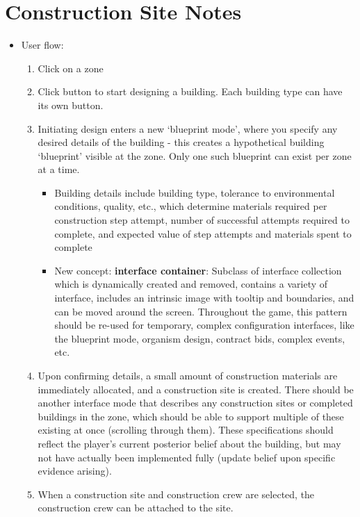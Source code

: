 \documentclass{article}
\begin{document}
\section*{Construction Site Notes}
\begin{itemize}
    \item User flow:
    \begin{enumerate}
        \item Click on a zone
        \item Click button to start designing a building. Each building type can have its own button.
        \item Initiating design enters a new `blueprint mode', where you specify any desired details of the building - this creates a
            hypothetical building `blueprint' visible at the zone. Only one such blueprint can exist per zone at a time.
        \begin{itemize}
            \item Building details include building type, tolerance to environmental conditions, quality, etc., which determine materials
                required per construction step attempt, number of successful attempts required to complete, and expected value of step
                attempts and materials spent to complete
            \item New concept: \textbf{interface container}: Subclass of interface collection which is dynamically created
                and removed, contains a variety of interface, includes an intrinsic image with tooltip and boundaries, and
                can be moved around the screen. Throughout the game, this pattern should be re-used for temporary, complex
                configuration interfaces, like the blueprint mode, organism design, contract bids, complex events, etc.
        \end{itemize}
        \item Upon confirming details, a small amount of construction materials are immediately allocated, and a construction site is
            created. There should be another interface mode that describes any construction sites or completed buildings in the
            zone, which should be able to support multiple of these existing at once (scrolling through them). These specifications
            should reflect the player's current posterior belief about the building, but may not have actually been implemented 
            fully (update belief upon specific evidence arising).
        \item When a construction site and construction crew are selected, the construction crew can be attached to the site.

\end{enumerate}
\end{itemize}
\end{document}
